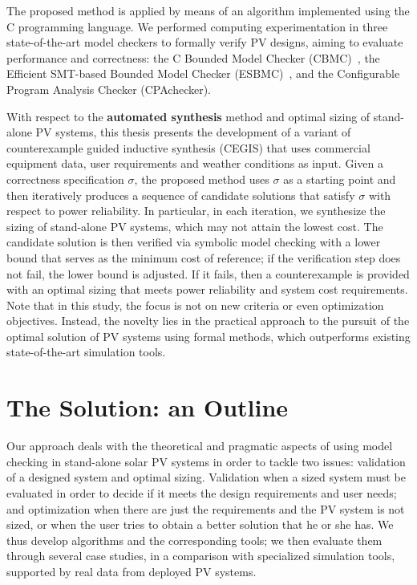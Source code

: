 The proposed method is applied by means of an algorithm implemented using the C programming language. We performed computing experimentation in three state-of-the-art model checkers to formally verify PV designs, aiming to evaluate performance and correctness: the C Bounded Model Checker (CBMC)~\cite{Kroening}, the Efficient SMT-based Bounded Model Checker (ESBMC)~\cite{esbmc2018}, and the Configurable Program Analysis Checker (CPAchecker).

With respect to the \textbf{automated synthesis} method and optimal sizing of stand-alone PV systems, this thesis presents the development of a variant of counterexample guided inductive synthesis (CEGIS) that uses commercial equipment data, user requirements and weather conditions as input. Given a correctness specification $\sigma$, the proposed method uses $\sigma$ as a starting point and then iteratively produces a sequence of candidate solutions that satisfy $\sigma$ with respect to power reliability. In particular, in each iteration, we synthesize the sizing of stand-alone PV systems, which may not attain the lowest cost. The candidate solution is then verified via symbolic model checking with a lower bound that serves as the minimum cost of reference; if the verification step does not fail, the lower bound is adjusted. If it fails, then a counterexample is provided with an optimal sizing that meets power reliability and system cost requirements. Note that in this study, the focus is not on new criteria or even optimization objectives. Instead, the novelty lies in the practical approach to the pursuit of the optimal solution of PV systems using formal methods, which outperforms existing state-of-the-art simulation tools.


\section{The Solution: an Outline}

Our approach deals with the theoretical and pragmatic aspects of using model checking in stand-alone solar PV systems in order to tackle two issues: validation of a designed system and optimal sizing. Validation when a sized system must be evaluated in order to decide if it meets the design requirements and user needs; and optimization when there are just the requirements and the PV system is not sized, or when the user tries to obtain a better solution that he or she has. We thus develop algorithms and the corresponding tools; we then evaluate them through several case studies, in a comparison with specialized simulation tools, supported by real data from deployed PV systems.

